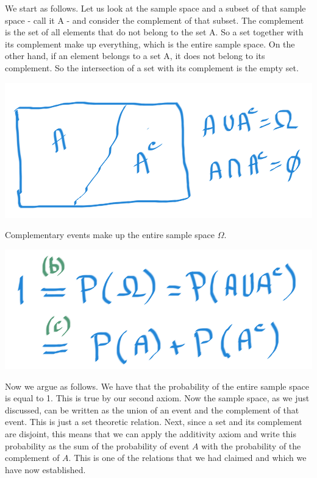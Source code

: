 \documentclass{tufte-handout}
\begin{document}
We start as follows. Let us look at the sample space and a subset of that sample space - call it A - and
consider the complement of that subset. The complement is the set of all elements that do not belong
to the set A. So a set together with its complement make up everything, which is the entire sample
space. On the other hand, if an element belongs to a set A, it does not belong to its complement. So the
intersection of a set with its complement is the empty set.
\begin{marginfigure}
  \includegraphics{AAcomplement}
  \caption{Complementary events make up the entire sample space $\Omega$.}
\end{marginfigure}

\begin{marginfigure}
  \includegraphics{DeriveComplement}
\end{marginfigure}

Now we argue as follows. We have that the probability of the entire sample space is equal to 1. This is
true by our second axiom. Now the sample space, as we just discussed, can be written as the union of
an event and the complement of that event. This is just a set theoretic relation. Next, since a set and
its complement are disjoint, this means that we can apply the additivity axiom and write this probability
as the sum of the probability of event $A$ with the probability of the complement of $A$. This is one of the
relations that we had claimed and which we have now established.
\end{document}
